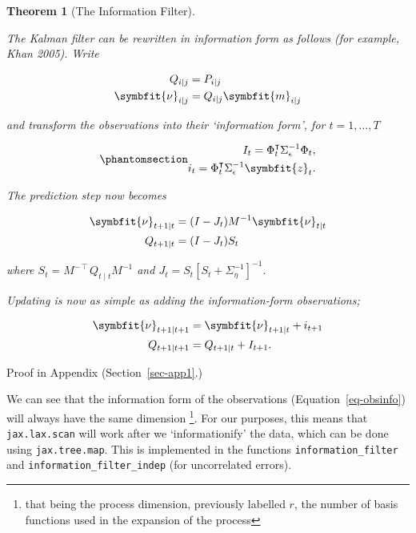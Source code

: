\documentclass[
]{report}
\newcommand{\bv}[1]{\symbfit{#1}}
\theoremstyle{plain}
\theoremstyle{plain}
\theoremstyle{plain}
\newtheorem{theorem}{Theorem}[section]
\theoremstyle{remark}
\begin{document}
\begin{theorem}[The Information
Filter]\protect\hypertarget{thm-information_filter}{}\label{thm-information_filter}

The Kalman filter can be rewritten in information form as follows (for
example, Khan 2005). Write

\[\begin{split}
Q_{i\mid j} &= P_{i\mid j}\\
\bv\nu_{i\mid j} &= Q_{i\mid j} \bv m_{i\mid j}
\end{split}
\]

and transform the observations into their `information form', for
\(t=1,\dots, T\)

\begin{equation}\phantomsection\label{eq-obsinfo}{\begin{split}
I_{t} = \Phi_{t}^{\intercal} \Sigma_{\epsilon}^{-1}\Phi_{t},\\
i_{t} = \Phi_{t}^{\intercal} \Sigma_{\epsilon}^{-1} \bv z_{t}.
\end{split}
}\end{equation}

The prediction step now becomes

\[\begin{split}
\bv\nu_{t+1\mid t} &= (I-J_t) M^{-1}\bv\nu_{t\mid t}\\
Q_{t+1\mid t} &= (I-J_t) S_{t} 
\end{split}
\]

where \(S_t = M^{-\intercal} Q_{t\mid t} M^{-1}\) and
\(J_t = S_t [S_{t}+\Sigma_{\eta}^{-1}]^{-1}\).

Updating is now as simple as adding the information-form observations;

\[\begin{split}
  \bv\nu_{t+1\mid t+1} &= \bv\nu_{t+1\mid t} + i_{t+1}\\
  Q_{t+1\mid t+1} &= Q_{t+1\mid t} + I_{t+1}.
\end{split}
\]

\end{theorem}

Proof in Appendix (Section~\ref{sec-app1}.)

We can see that the information form of the observations
(Equation~\ref{eq-obsinfo}) will always have the same dimension
\footnote{that being the process dimension, previously labelled \(r\),
  the number of basis functions used in the expansion of the process}.
For our purposes, this means that \texttt{jax.lax.scan} will work after
we `informationify' the data, which can be done using
\texttt{jax.tree.map}. This is implemented in the functions
\texttt{information\_filter} and \texttt{information\_filter\_indep}
(for uncorrelated errors).
\end{document}
